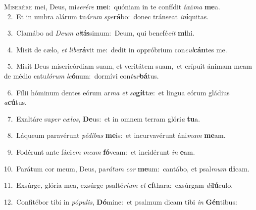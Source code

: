 \lettrine{\initial\textcolor{\initialcolor}{M}}{iserére} mei, Deus, mi\-\textit{se}\-\textit{ré}\textit{re} \textbf{me}\-i:~\star quóniam in te confídit áni\textit{ma} \textbf{me}\-a.\\
{\numbfont\textcolor{\numbcolor}{~2.}}~Et in umbra alárum tu\-\textit{á}\-\textit{rum} \textit{spe}\-\textbf{rá}bo:~\star donec tránseat \textit{in}\-\textbf{í}quitas.\par
{\numbfont\textcolor{\numbcolor}{~3.}}~Clamábo ad \textit{De}\-\textit{um} \textit{al}\-\textbf{tís}simum:~\star Deum, qui benefé\textit{cit} \textbf{mi}\-hi.\par
{\numbfont\textcolor{\numbcolor}{~4.}}~Misit de cælo, \textit{et} \textit{li}\-\textit{be}\textbf{rá}vit me:~\star dedit in oppróbrium con\-\textit{cul}\-\textbf{cán}tes me.\par
{\numbfont\textcolor{\numbcolor}{~5.}}~Misit Deus misericórdiam suam, et veritátem suam,~\dagger et erípuit ánimam meam de médio catu\-\textit{ló}\-\textit{rum} \textit{le}\-\textbf{ó}num:~\star dormívi con\-\textit{tur}\-\textbf{bá}tus.\par
{\numbfont\textcolor{\numbcolor}{~6.}}~Fílii hóminum dentes eórum ar\textit{ma} \textit{et} \textit{sa}\-\textbf{gít}tæ:~\star et lingua eórum gládius \textit{a}\-\textbf{cú}tus.\par
{\numbfont\textcolor{\numbcolor}{~7.}}~Exaltáre su\textit{per} \textit{cæ}\-\textit{los}, \textbf{De}\-us:~\star et in omnem terram glóri\textit{a} \textbf{tu}\-a.\par
{\numbfont\textcolor{\numbcolor}{~8.}}~Láqueum paravérunt \textit{pé}\-\textit{di}\textit{bus} \textbf{me}\-is:~\star et incurvavérunt áni\textit{mam} \textbf{me}\-am.\par
{\numbfont\textcolor{\numbcolor}{~9.}}~Fodérunt ante fáci\textit{em} \textit{me}\-\textit{am} \textbf{fó}\-veam:~\star et incidérunt \textit{in} \textbf{e}\-am.\par
{\numbfont\textcolor{\numbcolor}{10.}}~Parátum cor meum, Deus, pa\-\textit{rá}\-\textit{tum} \textit{cor} \textbf{me}\-um:~\star cantábo, et psal\textit{mum} \textbf{di}\-cam.\par
{\numbfont\textcolor{\numbcolor}{11.}}~Exsúrge, glória mea, exsúrge psalté\-\textit{ri}\-\textit{um} \textit{et} \textbf{cí}\-thara:~\star exsúrgam \textit{di}\-\textbf{lú}culo.\par
{\numbfont\textcolor{\numbcolor}{12.}}~Confitébor tibi in \textit{pó}\-\textit{pu}\textit{lis}, \textbf{Dó}\-mine:~\star et psalmum dicam tibi \textit{in} \textbf{Gén}\-tibus:\par
